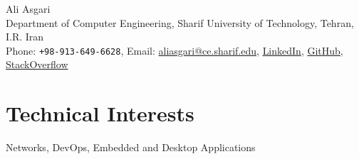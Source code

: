 \documentclass[10pt, a4paper]{article}
\begin{document}
{\LARGE Ali Asgari}\\[1cm]
Department of Computer Engineering, Sharif University of Technology, Tehran, I.R. Iran\\[.2cm]
Phone: \texttt{+98-913-649-6628}, Email: \href{mailto:aliasgari@ce.sharif.edu}{aliasgari@ce.sharif.edu},  \href{https://www.linkedin.com/in/ali-asgari-51981884/}{LinkedIn}, \href{https://github.com/altostratous}{GitHub}, \href{https://stackoverflow.com/users/2656621/ali-asgari?tab=profile}{StackOverflow}\\ 


\section*{Technical Interests}
Networks, DevOps, Embedded and Desktop Applications
\end{document}
